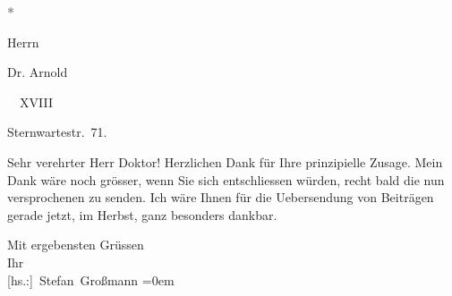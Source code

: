 \pstart
           \centering{}\textcolor{gray}{\textbf{*}}\pend
           
\pstart
           \raggedleft{}Herrn\pend
           
\pstart
           \raggedleft{}Dr. Arnold \pend
           
\pstart
           \raggedleft{}  XVIII\pend
           
\pstart
           \raggedleft{}Sternwartestr. 71.\pend
           
\pstart\center{}Sehr verehrter Herr Doktor!\pend\vspace{0.5em}
\pstart
           Herzlichen Dank für Ihre prinzipielle Zusage. Mein Dank wäre noch grösser, wenn Sie
               sich entschliessen würden, recht bald die nun versprochenen \label{K_L02451-1v}\label{K_L02451-1} zu senden. Ich wäre Ihnen für die Uebersendung von
               Beiträgen gerade jetzt, im Herbst, ganz besonders dankbar.\pend
           
\pstart
           Mit ergebensten Grüssen{\\[\baselineskip]}Ihr{\\[\baselineskip]}\spacefill\mbox{{[}hs.:{]} Stefan Großmann}\pend
           \leftskip=0em{}\endnumbering{}  \newcommand{\dateiname}{L02451}\newcommand{\titel}{Stefan Großmann an Arthur Schnitzler, [nach dem 25. 9. 1925]}\newcommand{\editorInnen}{Herausgegeben von Martin Anton Müller}
